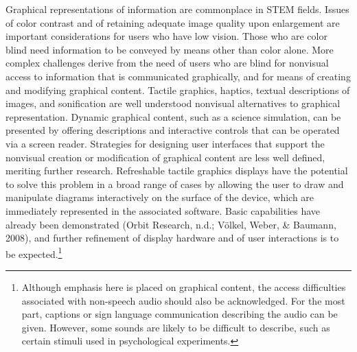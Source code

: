 \documentclass{sig-alternate} %
\begin{document}
\begin{large}
Graphical representations of information are commonplace in STEM fields. Issues of color contrast and of retaining adequate image quality upon enlargement are important considerations for users who have low vision. Those who are color blind need information to be conveyed by means other than color alone. More complex challenges derive from the need of users who are blind for nonvisual access to information that is communicated graphically, and for means of creating and modifying graphical content. Tactile graphics, haptics, textual descriptions of images, and sonification are well understood nonvisual alternatives to graphical representation. Dynamic graphical content, such as a science simulation, can be presented by offering descriptions and interactive controls that can be operated via a screen reader. Strategies for designing user interfaces that support the nonvisual creation or modification of graphical content are less well defined, meriting further research. Refreshable tactile graphics displays have the potential to solve this problem in a broad range of cases by allowing the user to draw and manipulate diagrams interactively on the surface of the device, which are immediately represented in the associated software. Basic capabilities have already been demonstrated (Orbit Research, n.d.; Völkel, Weber, \& Baumann, 2008), and further refinement of display hardware and of user interactions is to be expected.\footnote{Although emphasis here is placed on graphical content, the access difficulties associated with non-speech audio should also be acknowledged. For the most part, captions or sign language communication describing the audio can be given. However, some sounds are likely to be difficult to describe, such as certain stimuli used in psychological experiments.}


\end{large}
\end{document}
